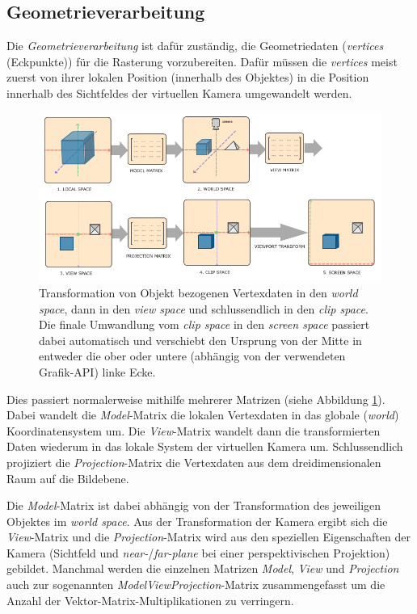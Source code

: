\documentclass[oneside]{ausarbeitung}
\begin{document}
\subsection{Geometrieverarbeitung}
\label{sub:geometry_processing}
Die \textit{Geometrieverarbeitung} ist dafür zuständig, die Geometriedaten (\textit{vertices} (Eckpunkte)) für die Rasterung vorzubereiten. Dafür müssen die \textit{vertices} meist zuerst von ihrer lokalen Position (innerhalb des Objektes) in die Position innerhalb des Sichtfeldes der virtuellen Kamera umgewandelt werden. 

\begin{figure}
    \includegraphics[width=\textwidth]{images/mvp_matrix.png}
    \caption{Transformation von Objekt bezogenen Vertexdaten in den \textit{world space}, dann in den \textit{view space} und schlussendlich in den \textit{clip space}. Die finale Umwandlung vom \textit{clip space} in den \textit{screen space} passiert dabei automatisch und verschiebt den Ursprung von der Mitte in entweder die ober oder untere (abhängig von der verwendeten Grafik-API) linke Ecke. \cite{learnopengl:coordinate_systems}}
    \label{fig:mvp_matrix}
\end{figure}

Dies passiert normalerweise mithilfe mehrerer Matrizen (siehe Abbildung \ref{fig:mvp_matrix}). Dabei wandelt die \textit{Model}-Matrix die lokalen Vertexdaten in das globale (\textit{world}) Koordinatensystem um. Die \textit{View}-Matrix wandelt dann die transformierten Daten wiederum in das lokale System der virtuellen Kamera um. Schlussendlich projiziert die \textit{Projection}-Matrix die Vertexdaten aus dem dreidimensionalen Raum auf die Bildebene. 

Die \textit{Model}-Matrix ist dabei abhängig von der Transformation des jeweiligen Objektes im \textit{world space}. Aus der Transformation der Kamera ergibt sich die \textit{View}-Matrix und die \textit{Projection}-Matrix wird aus den speziellen Eigenschaften der Kamera (Sichtfeld und \textit{near-}/\textit{far-plane} bei einer perspektivischen Projektion) gebildet. Manchmal werden die einzelnen Matrizen \textit{Model}, \textit{View} und \textit{Projection} auch zur sogenannten \textit{ModelViewProjection}-Matrix zusammengefasst um die Anzahl der Vektor-Matrix-Multiplikationen zu verringern.
\end{document}
